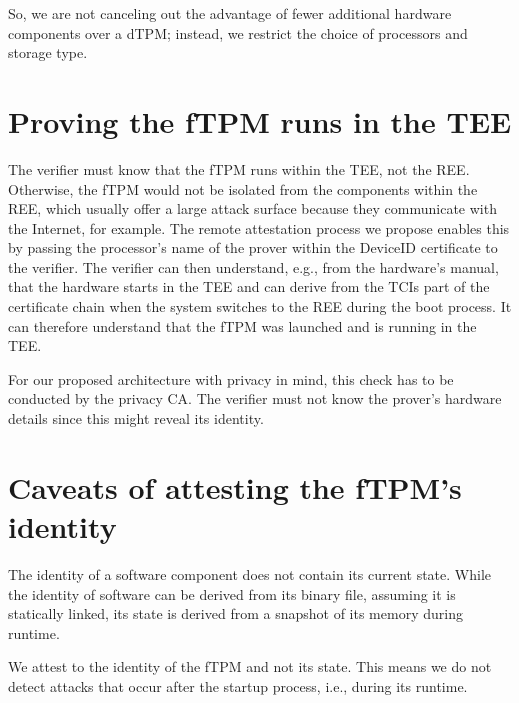 So, we are not canceling out the advantage of fewer additional hardware components over a \ac{dTPM}; instead, we restrict the choice of processors and storage type.




\section{Proving the fTPM runs in the TEE}

The verifier must know that the fTPM runs within the TEE, not the REE\@.
Otherwise, the fTPM would not be isolated from the components within the REE, which usually offer a large attack surface because they communicate with the Internet, for example.
The remote attestation process we propose enables this by passing the processor's name of the prover within the DeviceID certificate to the verifier.
The verifier can then understand, e.g., from the hardware's manual, that the hardware starts in the TEE and can derive from the TCIs part of the certificate chain when the system switches to the REE during the boot process.
It can therefore understand that the fTPM was launched and is running in the TEE\@.

For our proposed architecture with privacy in mind, this check has to be conducted by the privacy CA\@.
The verifier must not know the prover's hardware details since this might reveal its identity.

\section{Caveats of attesting the fTPM's identity}

The identity of a software component does not contain its current state.
While the identity of software can be derived from its binary file, assuming it is statically linked, its state is derived from a snapshot of its memory during runtime.

We attest to the identity of the fTPM and not its state.
This means we do not detect attacks that occur after the startup process, i.e., during its runtime.
